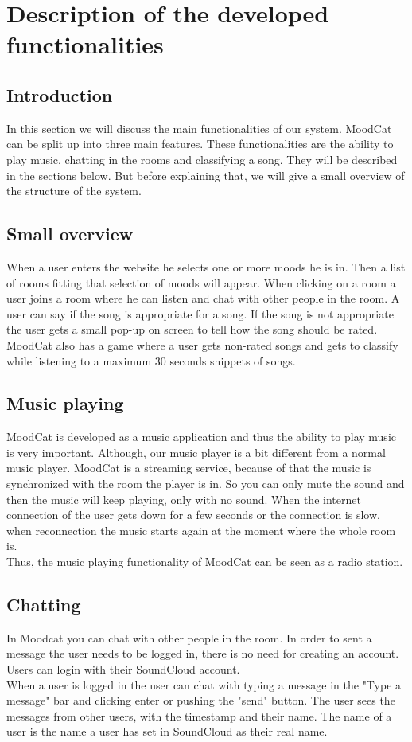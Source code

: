 \chapter{Description of the developed functionalities}

\section{Introduction}
In this section we will discuss the main functionalities of our system.
MoodCat can be split up into three main features.
These functionalities are the ability to play music, chatting in the rooms and classifying a song.
They will be described in the sections below.
But before explaining that, we will give a small overview of the structure of the system.

\section{Small overview}
When a user enters the website he selects one or more moods he is in. 
Then a list of rooms fitting that selection of moods will appear.
When clicking on a room a user joins a room where he can listen and chat with other people in the room.
A user can say if the song is appropriate for a song. If the song is not appropriate the user gets a small pop-up on screen to tell how the song should be rated.
\\
MoodCat also has a game where a user gets non-rated songs and gets to classify while listening to a maximum 30 seconds snippets of songs.


\section{Music playing}
MoodCat is developed as a music application and thus the ability to play music is very important.
Although, our music player is a bit different from a normal music player.
MoodCat is a streaming service, because of that the music is synchronized with the room the player is in.  
So you can only mute the sound and then the music will keep playing, only with no sound.
When the internet connection of the user gets down for a few seconds or the connection is slow, when reconnection the music starts again at the moment where the whole room is.\\
Thus, the music playing functionality of MoodCat can be seen as a radio station.

\section{Chatting}
In Moodcat you can chat with other people in the room.
In order to sent a message the user needs to be logged in, there is no need for creating an account.
Users can login with their SoundCloud account.\\
When a user is logged in the user can chat with typing a message in the "Type a message" bar and clicking enter or pushing the "send" button.
The user sees the messages from other users, with the timestamp and their name.
The name of a user is the name a user has set in SoundCloud as their real name.

